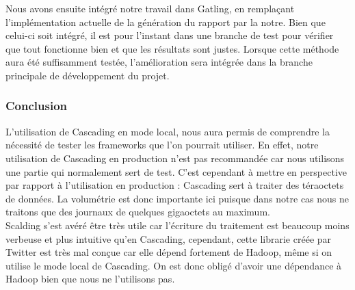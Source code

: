 Nous avons ensuite intégré notre travail dans Gatling, en remplaçant l'implémentation actuelle de la génération du rapport par la notre. Bien que celui-ci soit intégré, il est pour l'instant dans une branche de test pour vérifier que tout fonctionne bien et que les résultats sont justes. Lorsque cette méthode aura été suffisamment testée, l'amélioration sera intégrée dans la branche principale de développement du projet.

\subsubsection{Conclusion}

L'utilisation de Cascading en mode local, nous aura permis de comprendre la nécessité de tester les frameworks que l'on pourrait utiliser. En effet, notre utilisation de Cascading en production n'est pas recommandée car nous utilisons une partie qui normalement sert de test. C'est cependant à mettre en perspective par rapport à l'utilisation en production : Cascading sert à traiter des téraoctets de données. La volumétrie est donc importante ici puisque dans notre cas nous ne traitons que des journaux de quelques gigaoctets au maximum.\\

Scalding s'est avéré être très utile car l'écriture du traitement est beaucoup moins verbeuse et plus intuitive qu'en Cascading, cependant, cette librarie créée par Twitter est très mal conçue car elle dépend fortement de Hadoop, même si on utilise le mode local de Cascading. On est donc obligé d'avoir une dépendance à Hadoop bien que nous ne l'utilisons pas.

